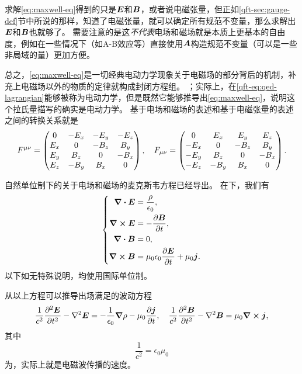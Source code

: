 求解\eqref{eq:maxwell-eq}得到的只是$\vb*{E}$和$\vb*{B}$，或者说电磁张量，但正如\ref{qft-sec:gauge-def}节中所说的那样，知道了电磁张量，就可以确定所有规范不变量，那么求解出$\vb*{E}$和$\vb*{B}$也就够了。
需要注意的是这\emph{不代表}电场和磁场就是本质上更基本的自由度，例如在一些情况下（如A-B效应等）直接使用$\vb*{A}$构造规范不变量（可以是一些非局域的量）更加方便。

总之，\eqref{eq:maxwell-eq}是一切经典电动力学现象关于电磁场的部分背后的机制，补充上电磁场以外的物质的定律就构成封闭方程组。
；实际上，在\eqref{qft-eq:qed-lagrangian}能够被称为电动力学，但是既然它能够推导出\eqref{eq:maxwell-eq}，说明这个拉氏量描写的确实是电动力学。
基于电场和磁场的表述和基于电磁张量的表述之间的转换关系就是
\begin{equation}
    F^{\mu \nu} = \pmqty{
        0 & -E_x & -E_y & -E_z \\
        E_x & 0 & -B_z & B_y \\
        E_y & B_z & 0 & -B_x \\
        E_z & -B_y & B_x & 0
    }, \quad F_{\mu \nu} = \pmqty{
        0 & E_x & E_y & E_z \\
        -E_x & 0 & -B_z & B_y \\
        -E_y & B_z & 0 & -B_x \\
        -E_z & -B_y & B_x & 0
    }.
\end{equation}

自然单位制下的关于电场和磁场的麦克斯韦方程已经导出。
在下，我们有
\begin{equation}
    \left\{
        \begin{aligned}
            \div{\vb*{E}} &= \frac{\rho}{\epsilon_0}, \\
            \curl{\vb*{E}} &= - \pdv{\vb*{B}}{t}, \\
            \div{\vb*{B}} &= 0, \\
            \curl{\vb*{B}} &= \mu_0 \epsilon_0 \pdv{\vb*{E}}{t} + \mu_0 \vb*{j}.
        \end{aligned}
    \right.
    \label{eq:maxwell-eq-si}
\end{equation}
以下如无特殊说明，均使用国际单位制。

从以上方程可以推导出场满足的波动方程
\begin{equation}
    \frac{1}{c^2} \pdv[2]{\vb*{E}}{t} - \laplacian{\vb*{E}} = - \frac{1}{\epsilon_0} \grad{\rho} - \mu_0 \pdv{\vb*{j}}{t} , \quad \frac{1}{c^2} \pdv[2]{\vb*{B}}{t} - \laplacian{\vb*{B}} = \mu_0 \curl{\vb*{j}},
    \label{eq:wave-eq-general}
\end{equation}
其中
\begin{equation}
    \frac{1}{c^2} = \epsilon_0 \mu_0
\end{equation}
为，实际上就是电磁波传播的速度。

